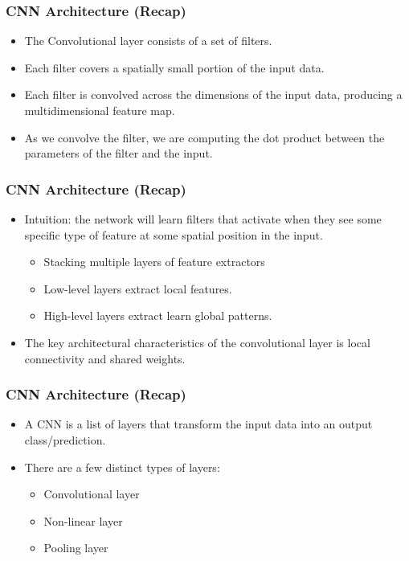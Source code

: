 \begin{frame}[fragile] \frametitle{CNN Architecture (Recap)}

\begin{itemize}
\item The Convolutional layer consists of a set of filters.
\item Each filter covers a spatially small portion of the input data.
\item Each filter is convolved across the dimensions of the input data, producing a multidimensional feature map.
\item As we convolve the filter, we are computing the dot product between the parameters of the filter and the input.
\end{itemize}
\end{frame}


\begin{frame}[fragile] \frametitle{CNN Architecture (Recap)}

\begin{itemize}
\item Intuition: the network will learn filters that activate when they see some specific type of feature at some spatial position in the input.
\begin{itemize}
\item Stacking multiple layers of feature extractors
\item Low-level layers extract local features.
\item High-level layers extract learn global patterns.
\end{itemize}
\item The key architectural characteristics of the convolutional layer is local connectivity and shared weights.
\end{itemize}
\end{frame}


\begin{frame}[fragile] \frametitle{CNN Architecture (Recap)}
\begin{itemize}
\item A CNN is a list of layers that transform the input data into an output class/prediction.
\item There are a few distinct types of layers:
\begin{itemize}
\item Convolutional layer
\item Non-linear layer
\item Pooling layer
\end{itemize}
\end{itemize}
\end{frame}


